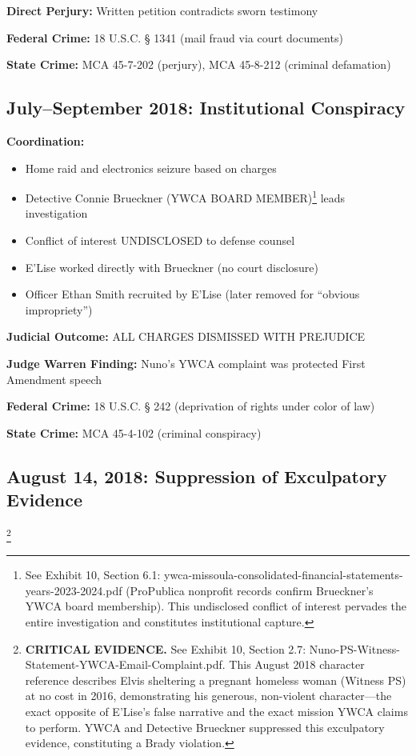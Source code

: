 \documentclass[12pt,oneside]{article}
\begin{document}
\textbf{Direct Perjury:} Written petition contradicts sworn testimony

\textbf{Federal Crime:} 18 U.S.C. § 1341 (mail fraud via court documents)

\textbf{State Crime:} MCA 45-7-202 (perjury), MCA 45-8-212 (criminal defamation)

\subsection*{July--September 2018: Institutional Conspiracy}

\textbf{Coordination:}

\begin{itemize}

\item Home raid and electronics seizure based on charges

\item Detective Connie Brueckner (YWCA BOARD MEMBER)\footnote{See Exhibit 10, Section 6.1: ywca-missoula-consolidated-financial-statements-years-2023-2024.pdf (ProPublica nonprofit records confirm Brueckner's YWCA board membership). This undisclosed conflict of interest pervades the entire investigation and constitutes institutional capture.} leads investigation

\item Conflict of interest UNDISCLOSED to defense counsel

\item E'Lise worked directly with Brueckner (no court disclosure)

\item Officer Ethan Smith recruited by E'Lise (later removed for ``obvious impropriety'')

\end{itemize}

\textbf{Judicial Outcome:} ALL CHARGES DISMISSED WITH PREJUDICE

\textbf{Judge Warren Finding:} Nuno's YWCA complaint was protected First Amendment speech

\textbf{Federal Crime:} 18 U.S.C. § 242 (deprivation of rights under color of law)

\textbf{State Crime:} MCA 45-4-102 (criminal conspiracy)

\subsection*{August 14, 2018: Suppression of Exculpatory Evidence}\footnote{\textbf{CRITICAL EVIDENCE.} See Exhibit 10, Section 2.7: Nuno-PS-Witness-Statement-YWCA-Email-Complaint.pdf. This August 2018 character reference describes Elvis sheltering a pregnant homeless woman (Witness PS) at no cost in 2016, demonstrating his generous, non-violent character---the exact opposite of E'Lise's false narrative and the exact mission YWCA claims to perform. YWCA and Detective Brueckner suppressed this exculpatory evidence, constituting a Brady violation.}
\end{document}
